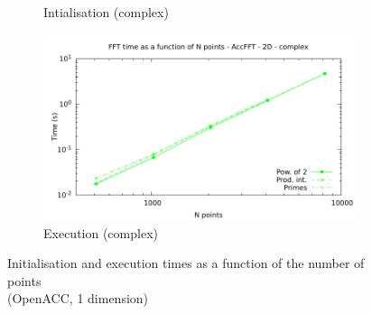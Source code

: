 \documentclass[12pt, a4paper]{article}
\begin{document}
\begin{figure}[H]
\begin{subfigure}{.5\textwidth}
\caption{Intialisation (complex)}
\label{FFTACC2DCI}
\end{subfigure}%
\begin{subfigure}{.5\textwidth}
\centering
\includegraphics[width=.9\linewidth]{graphs/fft-openacc-2d-pow2-c-exec.pdf}
\caption{Execution (complex)}
\label{FFTACC2DCE}
\end{subfigure}
\caption{Initialisation and execution times as a function of the number of points\\(OpenACC, 1 dimension)}
\label{FFTCL2D}
\end{figure}
\end{document}
